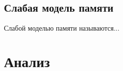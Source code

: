 \documentclass[times
              ]{itmo-student-thesis}
\begin{document}
    \subsection{Слабая модель памяти}
      Слабой моделью памяти называются...


  \section{Анализ}





\end{document}
